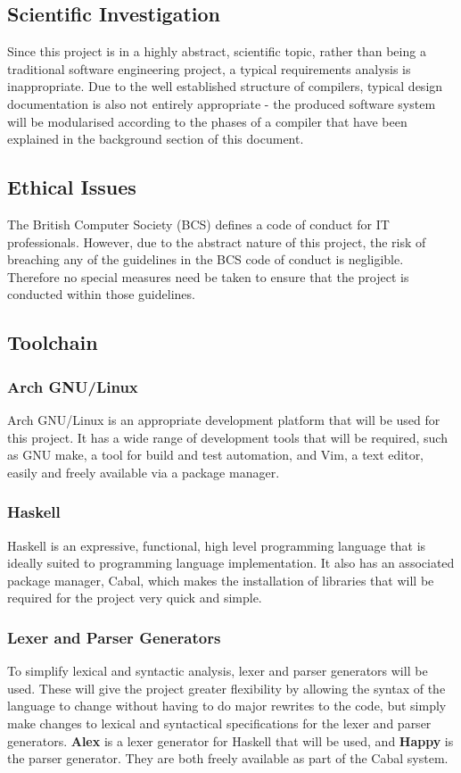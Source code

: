 \documentclass{article}
\begin{document}
\subsection{Scientific Investigation}
Since this project is in a highly abstract, scientific topic, rather than being a traditional software engineering project, a typical requirements analysis is inappropriate. Due to the well established structure of compilers, typical design documentation is also not entirely appropriate - the produced software system will be modularised according to the phases of a compiler that have been explained in the background section of this document.

\subsection{Ethical Issues} %
The British Computer Society (BCS) defines a code of conduct for IT professionals. However, due to the abstract nature of this project, the risk of breaching any of the guidelines in the BCS code of conduct is negligible. Therefore no special measures need be taken to ensure that the project is conducted within those guidelines.

\subsection{Toolchain}
\subsubsection{Arch GNU/Linux}
Arch GNU/Linux is an appropriate development platform that will be used for this project. It has a wide range of development tools that will be required, such as GNU make, a tool for build and test automation, and Vim, a text editor, easily and freely available via a package manager.

\subsubsection{Haskell}
Haskell is an expressive, functional, high level programming language that is ideally suited to programming language implementation. It also has an associated package manager, Cabal, which makes the installation of libraries that will be required for the project very quick and simple.

\subsubsection{Lexer and Parser Generators}
To simplify lexical and syntactic analysis, lexer and parser generators will be used. These will give the project greater flexibility by allowing the syntax of the language to change without having to do major rewrites to the code, but simply make changes to lexical and syntactical specifications for the lexer and parser generators. \textbf{Alex} is a lexer generator for Haskell that will be used, and \textbf{Happy} is the parser generator. They are both freely available as part of the Cabal system.
\end{document}
